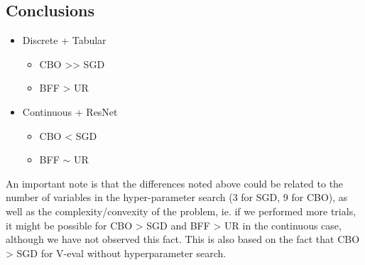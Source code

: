 \hypertarget{conclusions}{%
\subsection{Conclusions}\label{conclusions}}

\begin{itemize}
\tightlist
\item
  Discrete + Tabular

  \begin{itemize}
  \tightlist
  \item
    CBO \textgreater\textgreater{} SGD
  \item
    BFF \textgreater{} UR
  \end{itemize}
\item
  Continuous + ResNet

  \begin{itemize}
  \tightlist
  \item
    CBO \textless{} SGD
  \item
    BFF \(\sim\) UR
  \end{itemize}
\end{itemize}

An important note is that the differences noted above could be related
to the number of variables in the hyper-parameter search (3 for SGD, 9
for CBO), as well as the complexity/convexity of the problem, ie. if we
performed more trials, it might be possible for CBO \textgreater{} SGD
and BFF \textgreater{} UR in the continuous case, although we have not
observed this fact. This is also based on the fact that CBO
\textgreater{} SGD for V-eval without hyperparameter search.
